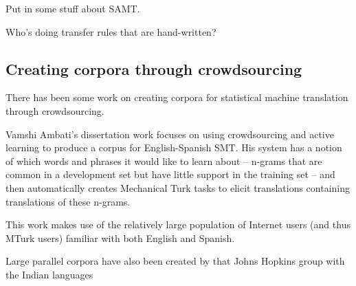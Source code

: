Put in some stuff about SAMT.

Who's doing transfer rules that are hand-written?

\subsection{Creating corpora through crowdsourcing}

There has been some work on creating corpora for statistical machine
translation through crowdsourcing.

Vamshi Ambati's dissertation work focuses on using crowdsourcing and active
learning to produce a corpus for English-Spanish SMT. His system has a notion
of which words and phrases it would like to learn about -- n-grams that are
common in a development set but have little support in the training set -- and
then automatically creates Mechanical Turk tasks to elicit translations
containing translations of these n-grams.

This work makes use of the relatively large population of Internet users (and
thus MTurk users) familiar with both English and Spanish.

\cite{ambati_naacl}

\cite{ambati_act}


Large parallel corpora have also been created by that Johns Hopkins group
with the Indian languages
\cite{post-callisonburch-osborne:2012:WMT}


